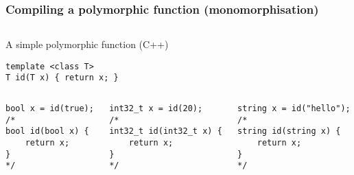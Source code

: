 \documentclass[t]{beamer}
\begin{document}
\begin{frame}[fragile]
\frametitle{Compiling a polymorphic function (monomorphisation)}

\begin{columns}
\begin{column}{0.48\textwidth}
\begin{block}{A simple polymorphic function (C++)}
\begin{verbatim}
template <class T>
T id(T x) { return x; }
\end{verbatim}
\end{block}
\end{column}
\end{columns}

\begin{columns}

\pause

\begin{column}{0.32\textwidth}
\begin{block}{}
\footnotesize
\begin{verbatim}
bool x = id(true);
/*
bool id(bool x) {
    return x;
}
*/
\end{verbatim}
\end{block}
\end{column}

\pause

\begin{column}{0.32\textwidth}
\begin{block}{}
\footnotesize
\begin{verbatim}
int32_t x = id(20);
/*
int32_t id(int32_t x) {
    return x;
}
*/
\end{verbatim}
\end{block}
\end{column}

\pause

\begin{column}{0.32\textwidth}
\begin{block}{}
\footnotesize
\begin{verbatim}
string x = id("hello");
/*
string id(string x) {
    return x;
}
*/
\end{verbatim}
\end{block}
\end{column}
\end{columns}

\end{frame}
\end{document}

